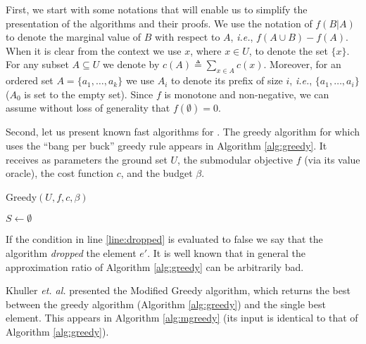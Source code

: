 First, we start with some notations that will enable us to simplify the presentation of the algorithms and their proofs.
We use the notation of $f(B|A)$ to denote the marginal value of $B$ with respect to $A$, {\em i.e.}, $f(A\cup B)-f(A)$.
When it is clear from the context we use $x$, where $x\in U$, to denote the set $\{ x\}$.
For any subset $A\subseteq U$ we denote by $c(A)\triangleq \sum _{x\in A}c(x)$.
Moreover, for an ordered set $A = \{a_1, \dots, a_k\}$ we use $A_i$ to denote its prefix of size $i$, {\em i.e.}, $\{a_1, \dots, a_i\}$ ($A_0$ is set to the empty set).
Since $f$ is monotone and non-negative, we can assume without loss of generality that $f(\emptyset)=0$.

{\color{red}{ROY: Do we really need the following: $(1)$ For a given instance we denote by $O$ an optimal solution; $(2)$ we assume that the cost function is in the range $[0, b]$.; $(3)$ We refer to the cost function in terms of value (e.g. cheap, expensive, most valuable, etc...) and
to the weight function in terms of size (e.g. small, medium, larger, etc...)}}

Second, let us present known fast algorithms for \SK.
The greedy algorithm for \SK which uses the ``bang per buck'' greedy rule appears in Algorithm \ref{alg:greedy}.
It receives as parameters the ground set $U$, the submodular objective $f$ (via its value oracle), the cost function $c$, and the budget $\beta$.

\begin{algorithm}[H]
\caption{Greedy$(U, f, c, \beta)$}
\label{alg:greedy}

$S \leftarrow \emptyset$
\\
\end{algorithm}

If the condition in line \ref{line:dropped} is evaluated to false we say that
the algorithm \emph{dropped} the element $e'$.
It is well known that in general the approximation ratio of Algorithm \ref{alg:greedy}
can be arbitrarily bad.

Khuller {\em et. al.} \cite{khuller1999budgeted} presented the Modified Greedy algorithm, which returns the best between the greedy algorithm (Algorithm \ref{alg:greedy}) and the single best element.
This appears in Algorithm \ref{alg:mgreedy} (its input is identical to that of Algorithm \ref{alg:greedy}).

